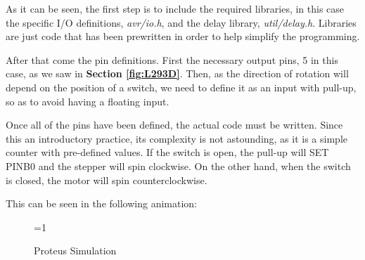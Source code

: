 As it can be seen, the first step is to include the required libraries, in this case the specific I/O definitions, \textit{avr/io.h}, and the delay library, \textit{util/delay.h}. Libraries are just code that has been prewritten in order to help simplify the programming.\medskip

\clearpage

After that come the pin definitions. First the necessary output pins, 5 in this case, as we saw in \textbf{Section \ref{fig:L293D}}. Then, as the direction of rotation will depend on the position of a switch, we need to define it as an input with pull-up, so as to avoid having a floating input. \medskip

Once all of the pins have been defined, the actual code must be written. Since this an introductory practice, its complexity is not astounding, as it is a simple counter with pre-defined values. If the switch is open, the pull-up will SET PINB0 and the stepper will spin clockwise. On the other hand, when the switch is closed, the motor will spin counterclockwise.\medskip

This can be seen in the following animation:


\begin{figure}[H]
    \centering
 
    \ifnum\value{ANIMATION}=1 {
    } 
    \fi
    
    \caption{Proteus Simulation}
    \label{fig:STEPPER_PROTEUS_ATMEGA}
\end{figure}
















